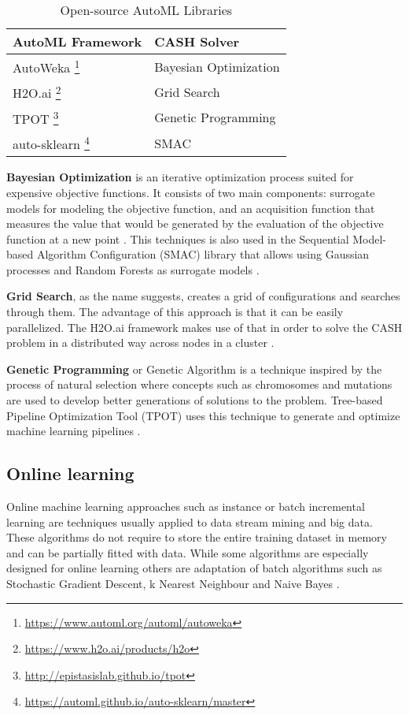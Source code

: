 \documentclass{sig-alternate-br}
\begin{document}
\begin{savenotes}
\begin{table}[h]
\renewcommand{\arraystretch}{1.25}
\centering
\begin{tabular}{|l|l|}
\hline
\textbf{AutoML Framework} & \textbf{CASH Solver} \\ \hline
AutoWeka \footnote{\url{https://www.automl.org/automl/autoweka}} & Bayesian Optimization \\ \hline
H2O.ai \footnote{\url{https://www.h2o.ai/products/h2o}} & Grid Search \\ \hline
TPOT \footnote{\url{http://epistasislab.github.io/tpot}} & Genetic Programming \\ \hline
auto-sklearn \footnote{\url{https://automl.github.io/auto-sklearn/master}} &  SMAC \\ \hline
\end{tabular}
\caption{Open-source AutoML Libraries}
\label{table:libraries}
\end{table}
\end{savenotes}

\textbf{Bayesian Optimization} is an iterative optimization process suited for expensive objective functions. It consists of two main components: surrogate models for modeling the objective function, and an acquisition function that measures the value that would be generated by the evaluation of the objective function at a new point \cite{zoller2019survey}. This techniques is also used in the Sequential Model-based Algorithm Configuration (SMAC) library that allows using Gaussian processes and Random Forests as surrogate models \cite{feurer2015autosklearn}.

\textbf{Grid Search}, as the name suggests, creates a grid of configurations and searches through them. The advantage of this approach is that it can be easily parallelized. The H2O.ai framework makes use of that in order to solve the CASH problem in a distributed way across nodes in a cluster \cite{h2o}. 

\textbf{Genetic Programming} or Genetic Algorithm is a technique inspired by the process of natural selection where concepts such as chromosomes and mutations are used to develop better generations of solutions to the problem. Tree-based Pipeline Optimization Tool (TPOT) uses this technique to generate and optimize machine learning pipelines \cite{tpot}.

\subsection{Online learning}
Online machine learning approaches such as instance or batch incremental learning are techniques usually applied to data stream mining and big data. These algorithms do not require to store the entire training dataset in memory and can be partially fitted with data. While some algorithms are especially designed for online learning \cite{bifet2012ensembles} others are adaptation of batch algorithms such as Stochastic Gradient Descent, k Nearest Neighbour and Naive Bayes \cite{van2014algorithm}. 
\end{document}
